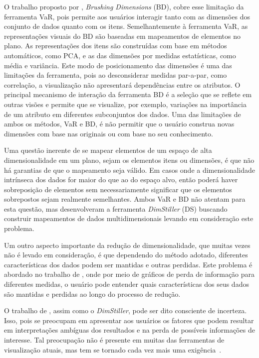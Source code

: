 O trabalho proposto por \citet{Turkay2011}, \emph{Brushing
Dimensions} (BD), cobre esse limitação da ferramenta VaR,
pois permite aos usuários interagir tanto com as dimensões
dos conjunto de dados quanto com os itens. Semelhantemente à
ferramenta VaR, as representações visuais do BD são baseadas
em mapeamentos de elementos no plano. As representações dos
itens são construídas com base em métodos automáticos, como
PCA, e as das dimensões por medidas estatísticas, como média
e variância. Este modo de posicionamento das dimensões é uma
das limitações da ferramenta, pois ao desconsiderar medidas
par-a-par, como correlação, a visualização não apresentará
dependências entre os atributos. O principal mecanismo de
interação da ferramenta BD é a seleção que se reflete em
outras visões e permite que se visualize, por exemplo,
variações na importância de um atributo em diferentes
subconjuntos dos dados. Uma das limitações de ambos os
métodos, VaR e BD, é não permitir que o usuário construa
novas dimensões com base nas originais ou
com base no seu conhecimento.

Uma questão inerente de se mapear elementos de um espaço de
alta dimensionalidade em um plano, sejam os elementos itens
ou dimensões, é que não há garantias de que o mapeamento
seja válido. Em casos onde a dimensionalidade intrínseca dos
dados for maior do que ao do espaço alvo, então poderá haver
sobreposição de elementos sem necessariamente significar que
os elementos sobrepostos sejam realmente semelhantes. Ambos
VaR e BD não atentam para esta questão, mas
\citet{Ingram2010} desenvolveram a ferramenta
\emph{DimStiller} (DS) buscando construir mapeamentos de
dados multidimensionais levando em consideração este
problema. 

Um outro aspecto importante da redução de dimensionalidade,
que muitas vezes não é levado em consideração, é que
dependendo do método adotado, diferentes características dos
dados podem ser mantidas e outras perdidas. Este problema é
abordado no trabalho de \citet{Johansson2009}, onde por meio
de gráficos de perda de informação para diferentes medidas,
o usuário pode entender quais características dos seus dados
são mantidas e perdidas ao longo do processo de redução. 

O trabalho de \citet{Johansson2009}, assim como o
\emph{DimStiller}, pode ser dito consciente de incerteza.
Isso, pois se preocupam em apresentar aos usuários os fatores que
podem resultar em interpretações ambíguas dos resultados e
na perda de possíveis informações de interesse. 
Tal preocupação não é presente em muitas das ferramentas de
visualização atuais, mas tem se tornado cada vez mais uma
exigência~\cite{Dill2012}.

